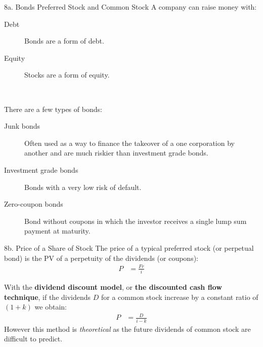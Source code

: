\begin{CHPT_SUMM_AUTO}[label = {L.-8a}]{8a. Bonds Preferred Stock and Common Stock}
A company can raise money with:
\begin{description}
	\item[Debt]	Bonds are a form of debt.
	\item[Equity]	Stocks are a form of equity.
\end{description}

\

There are a few types of bonds:
\begin{description}
	\item[Junk bonds]	Often used as a way to finance the takeover of a one corporation by another and are much riskier than investment grade bonds.
	\item[Investment grade bonds]	Bonds with a very low risk of default.
	\item[Zero-coupon bonds]	Bond without coupons in which the investor receives a single lump sum payment at maturity.
\end{description}
\end{CHPT_SUMM_AUTO}

\begin{CHPT_SUMM_AUTO}[label = {L.-8b}]{8b. Price of a Share of Stock}
The price of a typical preferred stock (or perpetual bond) is the PV of a perpetuity of the dividends (or coupons):
\begin{align*}
	P	&=	\frac{Fr}{i}
\end{align*}

With the \textbf{dividend discount model}, or \textbf{the discounted cash flow technique}, if the dividends $D$ for a common stock increase by a constant ratio of $(1 + k)$ we obtain:
\begin{align*}
	P	&=	\frac{D}{i - k}
\end{align*}
However this method is \textit{theoretical} as the future dividends of common stock are difficult to predict.
\end{CHPT_SUMM_AUTO}

